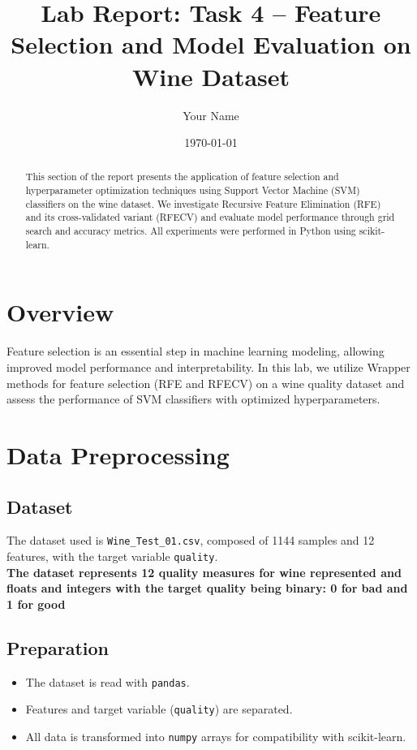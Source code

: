 \documentclass[12pt]{article}
\title{Lab Report: Task 4 -- Feature Selection and Model Evaluation on Wine Dataset}
\author{Your Name}
\date{\today}
\begin{document}
\maketitle

\begin{abstract}
This section of the report presents the application of feature selection and hyperparameter optimization techniques using Support Vector Machine (SVM) classifiers on the wine dataset. We investigate Recursive Feature Elimination (RFE) and its cross-validated variant (RFECV) and evaluate model performance through grid search and accuracy metrics. All experiments were performed in Python using scikit-learn.
\end{abstract}

\section{Overview}
Feature selection is an essential step in machine learning modeling, allowing improved model performance and interpretability. In this lab, we utilize Wrapper methods for feature selection (RFE and RFECV) on a wine quality dataset and assess the performance of SVM classifiers with optimized hyperparameters.

\section{Data Preprocessing}

\subsection{Dataset}
The dataset used is \texttt{Wine\_Test\_01.csv}, composed of 1144 samples and 12 features, with the target variable \texttt{quality}.\\
\textbf{The dataset represents 12 quality measures for wine represented and floats and integers with the target quality being binary: 0 for bad and 1 for good}

\subsection{Preparation}
\begin{itemize}
    \item The dataset is read with \texttt{pandas}.
    \item Features and target variable (\texttt{quality}) are separated.
    \item All data is transformed into \texttt{numpy} arrays for compatibility with scikit-learn.
\end{itemize}
\end{document}
